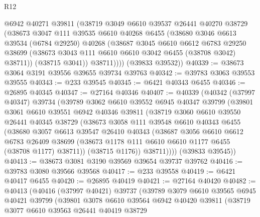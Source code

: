 \begin{lexlean}{R12}
\begin{coremodule}
          @6942
          @40271
          @39811
          (@38719
            @3049
            @6610
            @39537
            @26441
            @40270
            @38729
            (@38673
              @3047
              @111
              @39535
              @6610
              @40268
              @6455
              (@38680
                @3046
                @6613
                @39534
                (@6784 @29250)
                @40268
                (@38687
                  @3045
                  @6610
                  @6612
                  @6783
                  @29250
                  @38699
                  (@38673 @3043 @111 @6610 @6610 @3042 @6455 (@38708 @3042) @38711))
                (@38715 @3041))
              @38711))))
      (@39833 @39532))
@40339 := @38673 @3064 @3191 @39556 @39655 @39734 @39763
@40342 := @39783 @3063 @39553 @39555
@40343 := @233 @39545
@40345 := @6421 @40343 @6455
@40346 := @26895 @40345
@40347 := @27164 @40346
@40407 := @40339
    (@40342
      (@37997 @40347)
      @39734
      (@39789
        @3062
        @6610
        @39552
        @6945
        @40347
        @39799
        (@39801
          @3061
          @6610
          @39551
          @6942
          @40346
          @39811
          (@38719
            @3060
            @6610
            @39550
            @26441
            @40345
            @38729
            (@38673
              @3058
              @111
              @39548
              @6610
              @40343
              @6455
              (@38680
                @3057
                @6613
                @39547
                @26410
                @40343
                (@38687
                  @3056
                  @6610
                  @6612
                  @6783
                  @26409
                  @38699
                  (@38673 @1178 @111 @6610 @6610 @1177 @6455 (@38708 @1177) @38711))
                (@38715 @1176))
              @38711))))
      (@39833 @39545))
@40413 := @38673 @3081 @3190 @39569 @39654 @39737 @39762
@40416 := @39783 @3080 @39566 @39568
@40417 := @233 @39558
@40419 := @6421 @40417 @6455
@40420 := @26895 @40419
@40421 := @27164 @40420
@40482 := @40413
    (@40416
      (@37997 @40421)
      @39737
      (@39789
        @3079
        @6610
        @39565
        @6945
        @40421
        @39799
        (@39801
          @3078
          @6610
          @39564
          @6942
          @40420
          @39811
          (@38719
            @3077
            @6610
            @39563
            @26441
            @40419
            @38729

\end{coremodule}
\end{lexlean}
